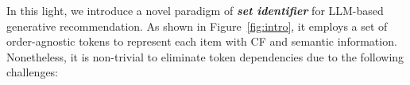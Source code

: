 In this light, we introduce a novel paradigm of \textbf{\textit{set identifier}} for LLM-based generative recommendation.  
As shown in Figure~\ref{fig:intro}, it employs a set of order-agnostic tokens to represent each item with CF and semantic information. 
Nonetheless, it is non-trivial to eliminate token dependencies due to the following challenges: 
 

